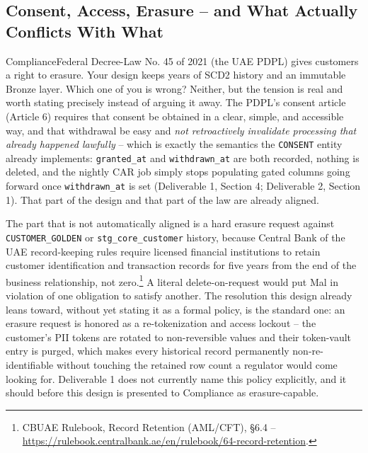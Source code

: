 \documentclass[11pt]{article}
\begin{document}
\subsection{Consent, Access, Erasure -- and What Actually Conflicts With What}
\begin{stakeholderq}{Compliance}{Federal Decree-Law No. 45 of 2021 (the UAE PDPL) gives customers a right to erasure. Your design keeps years of SCD2 history and an immutable Bronze layer. Which one of you is wrong?}
Neither, but the tension is real and worth stating precisely instead of arguing it away. The PDPL's consent article (Article 6) requires that consent be obtained in a clear, simple, and accessible way, and that withdrawal be easy and \emph{not retroactively invalidate processing that already happened lawfully} -- which is exactly the semantics the \texttt{CONSENT} entity already implements: \texttt{granted\_at} and \texttt{withdrawn\_at} are both recorded, nothing is deleted, and the nightly CAR job simply stops populating gated columns going forward once \texttt{withdrawn\_at} is set (Deliverable 1, Section 4; Deliverable 2, Section 1). That part of the design and that part of the law are already aligned.

The part that is not automatically aligned is a hard erasure request against \texttt{CUSTOMER\_GOLDEN} or \texttt{stg\_core\_customer} history, because Central Bank of the UAE record-keeping rules require licensed financial institutions to retain customer identification and transaction records for five years from the end of the business relationship, not zero.\footnote{CBUAE Rulebook, Record Retention (AML/CFT), \S6.4 -- \url{https://rulebook.centralbank.ae/en/rulebook/64-record-retention}.} A literal delete-on-request would put Mal in violation of one obligation to satisfy another. The resolution this design already leans toward, without yet stating it as a formal policy, is the standard one: an erasure request is honored as a re-tokenization and access lockout -- the customer's PII tokens are rotated to non-reversible values and their token-vault entry is purged, which makes every historical record permanently non-re-identifiable without touching the retained row count a regulator would come looking for. Deliverable 1 does not currently name this policy explicitly, and it should before this design is presented to Compliance as erasure-capable.
\end{stakeholderq}
\end{document}
